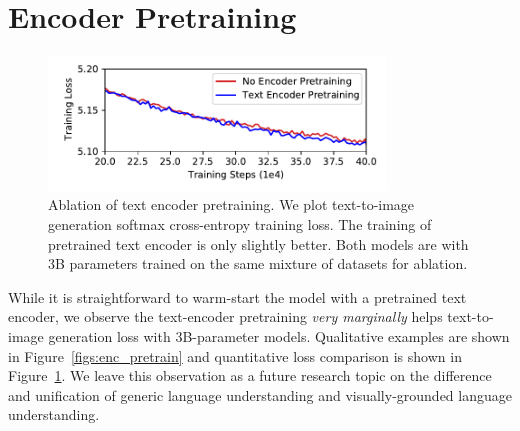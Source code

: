 \section{Encoder Pretraining} \label{secs:appendix_encoder_pretraining}




\begin{figure}[!ht]
\centering
\includegraphics[width=0.8\textwidth]{figures/text_pretraining_losscurve.pdf}
\caption{Ablation of text encoder pretraining. We plot text-to-image generation softmax cross-entropy training loss. The training of pretrained text encoder is only slightly better. Both models are with 3B parameters trained on the same mixture of datasets for ablation.}
\label{figs:text_pretrain_loss}
\end{figure}

While it is straightforward to warm-start the model with a pretrained text encoder, we observe the text-encoder pretraining \textit{very marginally} helps text-to-image generation loss with 3B-parameter \bdraw models. Qualitative examples are shown in Figure~\ref{figs:enc_pretrain} and quantitative loss comparison is shown in Figure~\ref{figs:text_pretrain_loss}. We leave this observation as a future research topic on the difference and unification of generic language understanding and visually-grounded language understanding.